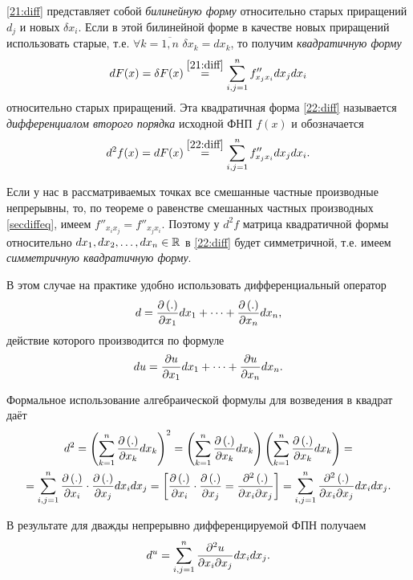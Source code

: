 \documentclass[../../main.tex]{subfiles}
\begin{document}
	\eqref{21:diff} представляет собой \emph{билинейную форму} относительно 
	старых приращений $d_j$ и новых $\delta x_i$. Если в этой билинейной форме 
	в качестве новых приращений использовать старые, т.е. 
	$\forall k = \overline{1, n}$ $\delta x_k = dx_k$, то получим 
	\emph{квадратичную форму}
	\begin{equation}
		dF(x) = \delta F(x) \overset{\eqref{21:diff}}{=} 
		\sum_{i, j = 1}^nf''_{x_jx_i}dx_jdx_i
		\label{22:diff}
	\end{equation}
	относительно старых приращений. Эта квадратичная форма \eqref{22:diff} 
	называется \emph{дифференциалом второго порядка} исходной ФНП $f(x)$ 
	и обозначается
	\[d^2f(x) = dF(x) \overset{\eqref{22:diff}}{=} 
	\sum_{i, j = 1}^nf''_{x_jx_i}dx_jdx_i.\]
		
	Если у нас в рассматриваемых точках все смешанные частные производные 
	непрерывны, то, по теореме о равенстве смешанных частных производных 
	\eqref{secdiffeq}, имеем $f''_{x_ix_j} = f''_{x_jx_i}$. Поэтому у $d^2f$ 
	матрица квадратичной формы относительно $dx_1, dx_2,\dots, dx_n\in\mathbb{R}$ в 
	\eqref{22:diff} будет симметричной, т.е. имеем 
	\emph{симметричную квадратичную форму}.
	
	В этом случае на практике удобно использовать дифференциальный оператор
	\begin{equation}
		d = \frac{\partial \left(.\right)}{\partial x_1}dx_1 + \dots + 
		\frac{\partial \left(.\right)}{\partial x_n}dx_n,
		\label{23:diff}
	\end{equation}
	действие которого производится по формуле
	\[du = \frac{\partial u}{\partial x_1}dx_1 + \dots + \frac{\partial u}{\partial x_n}dx_n.\]
	
	Формальное использование алгебраической формулы для возведения в квадрат 
	даёт
	\begin{gather*}
		d^2 = \left(\sum_{k = 1}^n\frac{\partial \left(.\right)}{\partial x_k}dx_k\right)^2 = 
		\left(\sum_{k = 1}^n\frac{\partial \left(.\right)}{\partial x_k}dx_k\right)
		\left(\sum_{k = 1}^n\frac{\partial \left(.\right)}{\partial x_k}dx_k\right) = \\
		= \sum_{i, j = 1}^n\frac{\partial \left(.\right)}{\partial x_i}\cdot
		\frac{\partial \left(.\right)}{\partial x_j}dx_idx_j = \left[\begin{aligned}
			\frac{\partial \left(.\right)}{\partial x_i}\cdot\frac{\partial \left(.\right)}{\partial x_j} = 
			\frac{\partial ^2\left(.\right)}{\partial x_i\partial x_j}
		\end{aligned}\right] = 
		\sum_{i, j = 1}^n\frac{\partial ^2\left(.\right)}{\partial x_i\partial x_j}dx_idx_j.
	\end{gather*}
	
	В результате для дважды непрерывно дифференцируемой ФПН получаем
	\[d^u = \sum_{i, j = 1}^n\frac{\partial ^2u}{\partial x_i\partial x_j}dx_idx_j.\]
	
\end{document}
